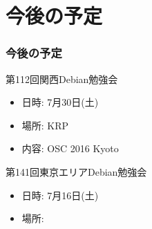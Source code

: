 \documentclass[cjk,dvipdfmx,10pt,compress,%
hyperref={bookmarks=true,bookmarksnumbered=true,bookmarksopen=false,%
colorlinks=false,%
pdftitle={第 111 回 関西 Debian 勉強会},%
pdfauthor={倉敷・のがた・佐々木・かわだ},%
pdfsubject={資料},%
}]{beamer}
\begin{document}
\section{今後の予定}
\begin{frame}[fragile]
  \frametitle{今後の予定}

  \begin{block}{第112回関西Debian勉強会}
    \begin{itemize}
    \item 日時: 7月30日(土)
    \item 場所: KRP
    \item 内容: OSC 2016 Kyoto
    \end{itemize}
  \end{block}

  \begin{block}{第141回東京エリアDebian勉強会}
    \begin{itemize}
    \item 日時: 7月16日(土)
    \item 場所:
    \end{itemize}
  \end{block}

\end{frame}

\takahashi[50]{  }
\end{document}
